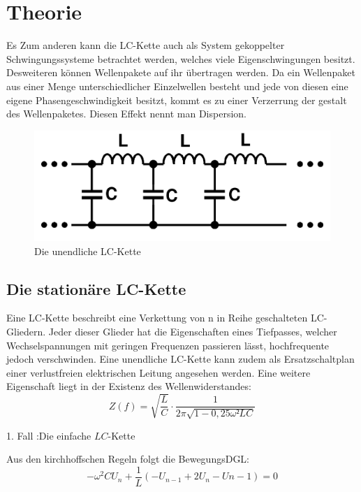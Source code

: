 
\section{Theorie}
\label{sec:Theorie}

 Es  Zum anderen kann die LC-Kette auch als System gekoppelter
    Schwingungssysteme betrachtet werden, welches viele Eigenschwingungen besitzt.
     Desweiteren können Wellenpakete auf ihr übertragen werden.
     Da ein Wellenpaket aus einer Menge unterschiedlicher Einzelwellen besteht
      und jede von diesen eine eigene Phasengeschwindigkeit besitzt, kommt es zu einer Verzerrung
  der gestalt des Wellenpaketes. Diesen Effekt nennt man Dispersion.


     \begin{figure}[H]
       \centering
       \includegraphics[width=\linewidth-300pt,height=\textheight-300pt,keepaspectratio]{content/Grafiken/LCKette.png}
       \caption{Die unendliche LC-Kette}
       \label{fig:LC-Kette}
     \end{figure}

\subsection{Die stationäre LC-Kette}
Eine LC-Kette beschreibt eine Verkettung von n in Reihe geschalteten LC-Gliedern.
 Jeder dieser Glieder hat die Eigenschaften eines Tiefpasses, welcher
  Wechselspannungen mit geringen Frequenzen passieren lässt, hochfrequente jedoch
   verschwinden. Eine unendliche LC-Kette kann zudem als Ersatzschaltplan einer
    verlustfreien elektrischen Leitung angesehen werden. Eine weitere Eigenschaft
     liegt in der Existenz des Wellenwiderstandes:
     \begin{equation}
       Z(f) = \sqrt{\frac{L}{C}} \cdot \frac{1}{2\pi \sqrt{1-0,25\omega² LC}}
     \end{equation}

1. Fall :Die einfache $LC$-Kette


Aus den kirchhoffschen Regeln folgt die BewegungsDGL:
\begin{equation}
- \omega ^2 C U_n + \frac{1}{L} \left( -U_{n-1} + 2U_ n -U{n-1} \right) = 0
\end{equation}

